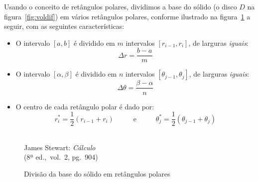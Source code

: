 Usando o conceito de retângulos polares, dividimos a base do sólido (o
disco $D$ na figura~\ref{fig:voldif}) em vários retângulos polares,
conforme ilustrado na figura~\ref{fig:retangpolar2} a seguir, com as
seguintes características:

\begin{itemize}
  \item O intervalo $[a, b]$ é dividido em $m$ intervalos $[r_{i-1},
    r_i]$, de larguras \emph{iguais}:
    \begin{equation*}
      \Delta r = \frac{b-a}{m}
    \end{equation*}
  \item O intervalo $[\alpha, \beta]$ é dividido em $n$ intervalos
    $[\theta_{j-1}, \theta_j]$, de larguras \emph{iguais}:
    \begin{equation*}
      \Delta \theta = \frac{\beta - \alpha}{n}
    \end{equation*}
  \item O centro de cada retângulo polar é dado por:
    \begin{equation*}
      r_i^* = \frac{1}{2}(r_{i-1}+r_i) \quad\ \quad\ \text{ e }
      \quad\ \quad\ \theta_j^* = \frac{1}{2}(\theta_{j-1}+\theta_j)
    \end{equation*}
\end{itemize}

\begin{figure}[H]
  \begin{center}
    \caption{Divisão da base do sólido em retângulos polares}
    \label{fig:retangpolar2}
    \\
    \footnotesize{James Stewart: \emph{Cálculo}\\ (8ª ed.,\ vol.\ 2, pg.\ 904)}
  \end{center}
\end{figure}

